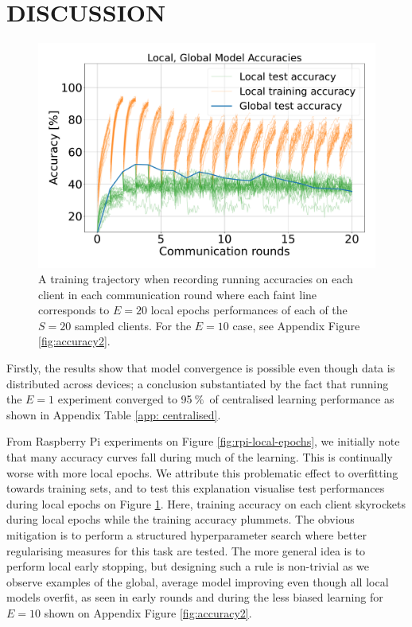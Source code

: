 \documentclass{article}
\newcommand{\unit}[1]{\ensuremath{\:\text{#1}}}
\newcommand{\pro}{\ensuremath{\unit{\%{}}}}
\begin{document}
\section{DISCUSSION}%
\label{sec:discussion}

\begin{figure}[htb!]
    \centering
        \includegraphics[width=\linewidth]{imgs/accuracy.pdf}
    \caption{
        A training trajectory when recording running accuracies on each client in each communication round where each faint line corresponds to $E=20$ local epochs performances of each of the $S=20$ sampled clients.
        For the $E=10$ case, see Appendix Figure \ref{fig:accuracy2}.
    }
    \label{fig:accuracy}
\end{figure}\noindent
Firstly, the results show that model convergence is possible even though data is distributed across devices; a conclusion substantiated by the fact that running the $E=1$ experiment converged to 95\pro\ of centralised learning performance as shown in Appendix Table \ref{app: centralised}.

From Raspberry Pi experiments on Figure \ref{fig:rpi-local-epochs}, we initially note that many accuracy curves fall during much of the learning.
This is continually worse with more local epochs.
We attribute this problematic effect to overfitting towards training sets, and to test this explanation visualise test performances during local epochs on Figure \ref{fig:accuracy}.
Here, training accuracy on each client skyrockets during local epochs while the training accuracy plummets.
The obvious mitigation is to perform a structured hyperparameter search where better regularising measures for this task are tested.
The more general idea is to perform local early stopping, but designing such a rule is non-trivial as we observe examples of the global, average model improving even though all local models overfit, as seen in early rounds and during the less biased learning for $E=10$ shown on Appendix Figure \ref{fig:accuracy2}.
\end{document}
